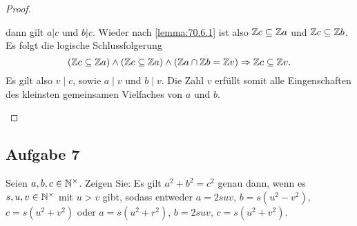 \begin{proof}
\begin{enumerate}[label=\alph*)]
          dann gilt $a | c$ und $b | c$.
          Wieder nach \autoref{lemma:70.6.1} ist also
          $\mathbb{Z}{}c \subseteq \mathbb{Z}{}a$ und
          $\mathbb{Z}{}c \subseteq \mathbb{Z}{}b$.
          Es folgt die logische Schlussfolgerung
          \begin{equation*}
            (\mathbb{Z}{}c \subseteq \mathbb{Z}{}a) \wedge
            (\mathbb{Z}{}c \subseteq \mathbb{Z}{}a) \wedge
            (\mathbb{Z}{}a \cap \mathbb{Z}{}b = \mathbb{Z}{}v)
            \Rightarrow \mathbb{Z}{}c \subseteq \mathbb{Z}{}v.
          \end{equation*}
          Es gilt also $v \mid c$, sowie $a \mid v$ und $b \mid v$.
          Die Zahl $v$ erfüllt somit alle Eingenschaften des
          kleinsten gemeinsamen Vielfaches von $a$ und $b$.
  \end{enumerate}
\end{proof}

\subsection{Aufgabe 7}
Seien $a,b,c \in \mathbb{N}^\times$. Zeigen Sie: Es gilt $a^2 + b^2 = c^2$ genau dann,
wenn es $s,u,v \in \mathbb{N}^\times$ mit $u > v$ gibt, sodass entweder
$a = 2suv$, $b = s(u^2 - v^2)$, $c = s(u^2 + v^2)$ oder
$a = s(u^2 + r^2)$, $b = 2suv$, $c = s(u^2 + v^2)$.
